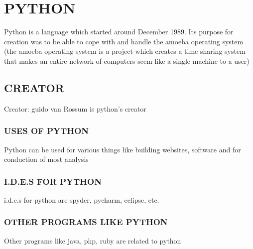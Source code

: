 \documentclass{article}
\begin{document}
\section{PYTHON}
	Python is a language which started around December 1989. 
	Its purpose for creation was to be able to cope with and handle the amoeba operating system (the amoeba operating system is a project which creates a time sharing system that makes an entire network of computers seem like a single machine to a user)
	\subsection{CREATOR}
	Creator: guido van Rossum is python’s creator
	\subsubsection{USES OF PYTHON}
	Python can be used for various things like building websites,
	 software and for conduction of most analysis
	 \subsubsection{I.D.E.S FOR PYTHON}
	i.d.e.s for python are spyder, pycharm, eclipse, etc.
	\subsubsection{OTHER PROGRAMS LIKE PYTHON}
	Other programs like java, php, ruby are related to python
\end{document}
